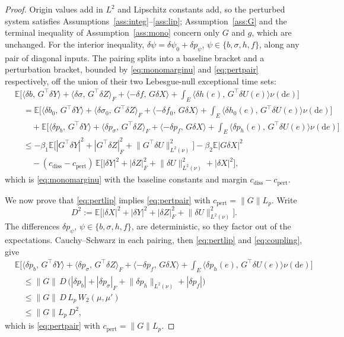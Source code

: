 \documentclass[preprint,12pt]{elsarticle}
\newcommand{\E}{\mathbb{E}}
\newcommand{\diff}{\mathrm{d}}
\newcommand{\inner}[2]{\langle #1,\,#2\rangle}
\newcommand{\Lnu}{L^2(\nu)}
\newcommand{\Gstar}{G^{\!\top}}
\newcommand{\Lnorm}[1]{\lVert #1\rVert_{\Lnu}}
\numberwithin{equation}{section}
\theoremstyle{plain}
\theoremstyle{definition}
\theoremstyle{\PaperRemarkStyle}
\begin{document}
\begin{proof}
Origin values add in $L^2$ and Lipschitz constants add, so the perturbed system satisfies
Assumptions~\ref{ass:integ}--\ref{ass:lip}; Assumption~\ref{ass:G} and the terminal
inequality of Assumption~\ref{ass:mono} concern only $G$ and $g$, which are unchanged.
For the interior inequality, $\delta\psi=\delta\psi_0+\delta p_\psi$,
$\psi\in\{b,\sigma,h,f\}$, along any pair of diagonal inputs.
The pairing splits into a baseline bracket and a perturbation bracket, bounded by
\eqref{eq:monomarginu} and \eqref{eq:pertpair} respectively, off the union of their two
Lebesgue-null exceptional time sets:
\[
\begin{aligned}
&\E\!\Big[\inner{\delta b}{\Gstar\delta Y}+\inner{\delta\sigma}{\Gstar\delta Z}_F
+\inner{-\delta f}{G\delta X}+\!\int_E\!\inner{\delta h(e)}{\Gstar\delta U(e)}\nu(\diff e)\Big]\\
&\quad=\E\!\Big[\inner{\delta b_0}{\Gstar\delta Y}+\inner{\delta\sigma_0}{\Gstar\delta Z}_F
+\inner{-\delta f_0}{G\delta X}+\!\int_E\!\inner{\delta h_0(e)}{\Gstar\delta U(e)}\nu(\diff e)\Big]\\
&\qquad+\E\!\Big[\inner{\delta p_b}{\Gstar\delta Y}+\inner{\delta p_\sigma}{\Gstar\delta Z}_F
+\inner{-\delta p_f}{G\delta X}+\!\int_E\!\inner{\delta p_h(e)}{\Gstar\delta U(e)}\nu(\diff e)\Big]\\
&\quad\le-\beta_1\E\big[|\Gstar\delta Y|^2+|\Gstar\delta Z|_F^2+\Lnorm{\Gstar\delta U}^2\big]-\beta_2\E|G\delta X|^2\\
&\qquad-(c_{\mathrm{diss}}-c_{\mathrm{pert}})\,\E\big[|\delta Y|^2+|\delta Z|_F^2+\Lnorm{\delta U}^2+|\delta X|^2\big] ,
\end{aligned}
\]
which is \eqref{eq:monomarginu} with the baseline constants and margin
$c_{\mathrm{diss}}-c_{\mathrm{pert}}$.

We now prove that \eqref{eq:pertlip} implies \eqref{eq:pertpair} with
$c_{\mathrm{pert}}=\|G\|L_p$. Write
\[
D^2:=\E\big[|\delta X|^2+|\delta Y|^2+|\delta Z|_F^2+\Lnorm{\delta U}^2\big].
\]
The differences $\delta p_\psi$,
$\psi\in\{b,\sigma,h,f\}$, are deterministic, so they factor out of the expectations.
Cauchy--Schwarz in each pairing, then \eqref{eq:pertlip} and \eqref{eq:coupling}, give
\[
\begin{aligned}
&\E\!\Big[\inner{\delta p_b}{\Gstar\delta Y}+\inner{\delta p_\sigma}{\Gstar\delta Z}_F
+\inner{-\delta p_f}{G\delta X}+\!\int_E\!\inner{\delta p_h(e)}{\Gstar\delta U(e)}\nu(\diff e)\Big]\\
&\quad\le\|G\|\,D\,\bigl(|\delta p_b|+|\delta p_\sigma|_F+\Lnorm{\delta p_h}+|\delta p_f|\bigr)\\
&\quad\le\|G\|\,D\,L_p\,W_2(\mu,\mu')\\
&\quad\le\|G\|L_p\,D^2 ,
\end{aligned}
\]
which is \eqref{eq:pertpair} with $c_{\mathrm{pert}}=\|G\|L_p$.
\end{proof}
\end{document}
